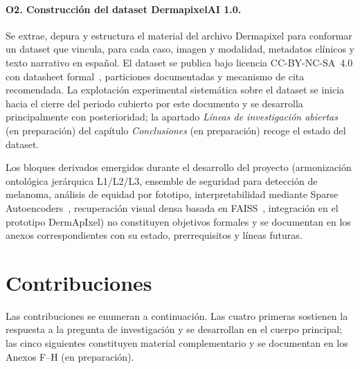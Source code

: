 \paragraph{O2. Construcción del dataset DermapixelAI 1.0.}
Se extrae, depura y estructura el material del archivo Dermapixel
para conformar un dataset que vincula, para cada caso, imagen y
modalidad, metadatos clínicos y texto narrativo en español. El
dataset se publica bajo licencia CC-BY-NC-SA~4.0 con datasheet
formal~\cite{datasheets2018}, particiones documentadas y mecanismo
de cita recomendada. La explotación experimental sistemática sobre
el dataset se inicia hacia el cierre del periodo cubierto por este
documento y se desarrolla principalmente con posterioridad;
la apartado \emph{Líneas de investigación abiertas} (en preparación) del capítulo \emph{Conclusiones} (en preparación)
recoge el estado del dataset.

Los bloques derivados emergidos durante el desarrollo del proyecto
(armonización ontológica jerárquica L1/L2/L3, ensemble de seguridad
para detección de melanoma, análisis de equidad por fototipo,
interpretabilidad mediante Sparse Autoencoders~\cite{templeton2024},
recuperación visual densa basada en FAISS~\cite{faiss2019},
integración en el prototipo DermApIxel) no constituyen objetivos
formales y se documentan en los anexos correspondientes con su
estado, prerrequisitos y líneas futuras.

\section{Contribuciones}
\label{sec:contribuciones}

Las contribuciones se enumeran a continuación. Las cuatro primeras
sostienen la respuesta a la pregunta de investigación y se
desarrollan en el cuerpo principal; las cinco siguientes constituyen
material complementario y se documentan en los
Anexos F--H (en preparación).

